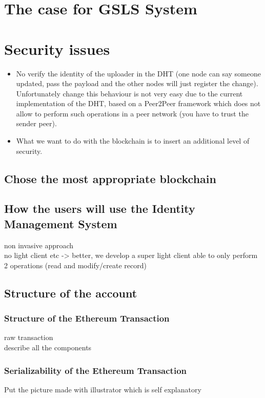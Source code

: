 \label{S:3}

\section{The case for GSLS System}

\section{Security issues}
\begin{itemize}
  \item No verify the identity of the uploader in the DHT (one node can say someone updated, pass the payload and the other nodes will just register the change). Unfortunately change this behaviour is not very easy due to the current implementation of the DHT, based on a Peer2Peer framework which does not allow to perform such operations in a peer network (you have to trust the sender peer).
  \item What we want to do with the blockchain is to insert an additional level of security.
\end{itemize}



\subsection{Chose the most appropriate blockchain}



\subsection{How the users will use the Identity Management System}
non invasive approach\\
no light client etc -> better, we develop a super light client able to only perform 2 operations (read and modify/create record)


\subsection{Structure of the account}

\subsubsection{Structure of the Ethereum Transaction}

raw transaction\\

describe all the components

\subsubsection{Serializability of the Ethereum Transaction}

Put the picture made with illustrator which is self explanatory